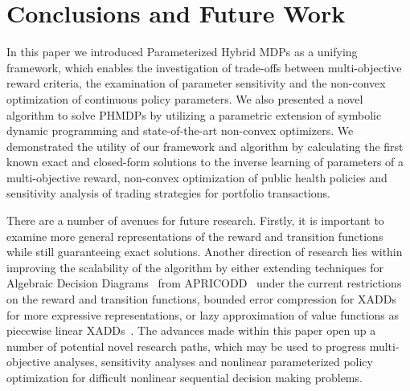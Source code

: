 \section{Conclusions and Future Work}
\label{sec:conclusion}

In this paper we introduced Parameterized Hybrid MDPs as a unifying framework, which enables the investigation of trade-offs between multi-objective reward criteria, the examination of parameter sensitivity and the non-convex optimization of continuous policy parameters. We also presented a novel algorithm to solve PHMDPs by utilizing a parametric extension of symbolic dynamic programming and state-of-the-art non-convex optimizers. We demonstrated the utility of our framework and algorithm by calculating the first known exact and closed-form solutions to the inverse learning of parameters of a multi-objective reward, non-convex optimization of public health policies and sensitivity analysis of trading strategies for portfolio transactions.

There are a number of avenues for future research. Firstly, it is important to examine more general representations of the reward and transition functions while still guaranteeing exact solutions. Another direction of research lies within improving the scalability of the algorithm by either extending techniques for Algebraic Decision Diagrams~\parencite{Bahar_JoFMiSD_1993} from APRICODD~\parencite{St-Aubin_NIPS_2000} under the current restrictions on the reward and transition functions, bounded error compression for XADDs~\parencite{Vianna_UAI_2013} for more expressive representations, or lazy approximation of value functions as piecewise linear XADDs~\parencite{Li_AAAI_2005}. The advances made within this paper open up a number of potential novel research paths, which may be used to progress multi-objective analyses, sensitivity analyses and nonlinear parameterized policy optimization for difficult nonlinear sequential decision making problems.
